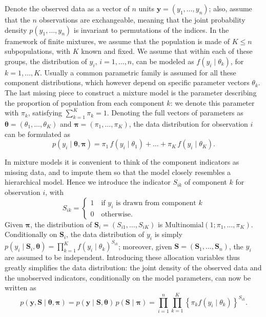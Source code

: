 Denote the observed data as a vector of $n$ units $\bm{y} = (y_1,\dots,y_n)$; also, assume that the $n$ observations are exchangeable, meaning that the joint probability density $p(y_1,\dots,y_n)$ is invariant to permutations of the indices. In the framework of finite mixtures, we assume that the population is made of $K\leq n$ subpopulations, with $K$ known and fixed.
We assume that within each of these groups, the distribution of $y_i$, $i=1,\dots,n$, can be modeled as $f(y_i \mid \theta_k)$, for $k=1,\dots,K$. Usually a common parametric family is assumed for all these component distributions, which however depend on specific parameter vectors $\theta_k$.
The last missing piece to construct a mixture model is the parameter describing the proportion of population from each component $k$: we denote this parameter with $\pi_k$, satisfying $\sum_{k=1}^K \pi_k = 1$. Denoting the full vectors of parameters as $\bm{\theta} = (\theta_1,\dots,\theta_K)$ and $\bm{\pi} = (\pi_1,\dots,\pi_K)$, the data distribution for observation $i$ can be formulated as
\begin{equation*}
p(y_i\mid \bm{\theta},\bm{\pi}) = \pi_1 \, f(y_i\mid\theta_1) + \dots + \pi_K \, f(y_i\mid\theta_K).
\end{equation*}

In mixture models it is convenient to think of the component indicators as missing data, and to impute them so that the model closely resembles a hierarchical model. Hence we introduce the indicator $S_{ik}$ of component $k$ for observation $i$, with 
\begin{equation*}
S_{ik} = \begin{cases}
1 \quad \text{if $y_i$ is drawn from component $k$}\\
0 \quad \text{otherwise}.
\end{cases}
\end{equation*}
Given $\bm{\pi}$, the distribution of $\bm{S}_i = (S_{i1},\dots,S_{iK})$ is $\mathrm{Multinomial}(1;\pi_1,\dots,\pi_K)$. 
Conditionally on $\bm{S}_{i}$, the data distribution of $y_i$ is simply $p(y_i\mid \bm{S}_i,\bm{\theta}) = \prod_{k=1}^K f(y_i\mid\theta_k)^{S_{ik}}$; moreover, given $\bm{S}=(\bm{S}_1,\dots,\bm{S}_n)$, the $y_i$ are assumed to be independent.
Introducing these allocation variables thus greatly simplifies the data distribution: the joint density of the observed data and the unobserved indicators, conditionally on the model parameters, can now be written as 
\begin{equation*}
p(\bm{y},\bm{S}\mid \bm{\theta},\bm{\pi}) = p(\bm{y}\mid\bm{S},\bm{\theta})\, p(\bm{S}\mid\bm{\pi}) = 
\prod_{i=1}^n \prod_{k=1}^K \left\{ \pi_k f(y_i\mid\theta_k) \right\}^{S_{ik}}.
\end{equation*}

